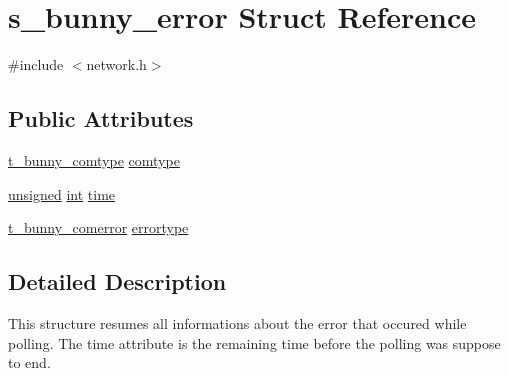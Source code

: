 \hypertarget{structs__bunny__error}{\section{s\-\_\-bunny\-\_\-error Struct Reference}
\label{structs__bunny__error}
}


{\ttfamily \#include $<$network.\-h$>$}

\subsection*{Public Attributes}
\begin{DoxyCompactItemize}
\item 
\hyperlink{network_8h_ac01621d0080b82d3bebc95c8338b24ce}{t\-\_\-bunny\-\_\-comtype} \hyperlink{structs__bunny__error_a7cb1f2ded1b125ee5162842ee18488cc}{comtype}
\item 
\hyperlink{curses_8priv_8h_aca40206900cfc164654362fa8d4ad1e6}{unsigned} \hyperlink{term__entry_8h_ad65b480f8c8270356b45a9890f6499ae}{int} \hyperlink{structs__bunny__error_a57069536d3cf2d75081b770d3f2205b7}{time}
\item 
\hyperlink{network_8h_adabfc6181c56bb211bb36b04c892ed6b}{t\-\_\-bunny\-\_\-comerror} \hyperlink{structs__bunny__error_a88f14e08a33d700bd2c490de186a386c}{errortype}
\end{DoxyCompactItemize}


\subsection{Detailed Description}
This structure resumes all informations about the error that occured while polling. The time attribute is the remaining time before the polling was suppose to end. 

